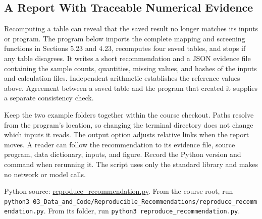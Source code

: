 \hypertarget{M01-a-report-with-traceable-numerical-evidence}{%
\subsection{A Report With Traceable Numerical
Evidence}\label{M01-a-report-with-traceable-numerical-evidence}}

\noindent \noindent Recomputing a table can reveal that the saved result no longer
matches its inputs or program. The program below imports the complete
mapping and screening functions in Sections 5.23 and 4.23, recomputes
four saved tables, and stops if any table disagrees. It writes a short
recommendation and a JSON evidence file containing the sample counts,
quantities, missing values, and hashes of the inputs and calculation
files. Independent arithmetic establishes the reference values above.
Agreement between a saved table and the program that created it supplies
a separate consistency check.

Keep the two example folders together within the course checkout. Paths
resolve from the program's location, so changing the terminal directory
does not change which inputs it reads. The output option adjusts
relative links when the report moves. A reader can follow the
recommendation to its evidence file, source program, data dictionary,
inputs, and figure. Record the Python version and command when rerunning
it. The script uses only the standard library and makes no network or
model calls.

\FloatBarrier
{}
Python source:
\href{../03_Data_and_Code/Reproducible_Recommendations/reproduce_recommendation.py}{reproduce\_recommendation.py}.
From the course root, run
\texttt{python3\ 03\_Data\_and\_Code/Reproducible\_Recommendations/reproduce\_recommendation.py}.
From its folder, run \texttt{python3\ reproduce\_recommendation.py}.

